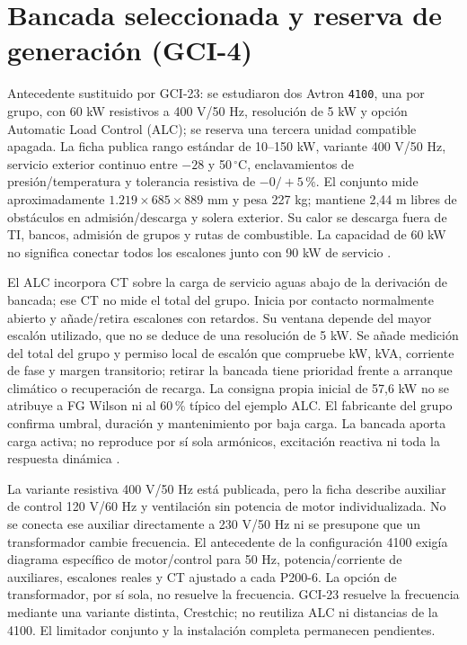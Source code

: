 \section{Bancada seleccionada y reserva de generación (GCI-4)}
\label{sec:sd4-generacion-gci4}

Antecedente sustituido por GCI-23: se estudiaron dos Avtron \texttt{4100}, una por grupo, con 60 kW resistivos a 400 V/50 Hz, resolución de 5 kW y opción Automatic Load Control (ALC); se reserva una tercera unidad compatible apagada. La ficha publica rango estándar de 10--150 kW, variante 400 V/50 Hz, servicio exterior continuo entre $-28$ y 50\,$^{\circ}$C, enclavamientos de presión/temperatura y tolerancia resistiva de $-0/+5\,\%$. El conjunto mide aproximadamente $1.219\times685\times889$ mm y pesa 227 kg; mantiene 2,44 m libres de obstáculos en admisión/descarga y solera exterior. Su calor se descarga fuera de TI, bancos, admisión de grupos y rutas de combustible. La capacidad de 60 kW no significa conectar todos los escalones junto con 90 kW de servicio \parencite[pp.~1--2]{lote17-avtron-4100}.

El ALC incorpora CT sobre la carga de servicio aguas abajo de la derivación de bancada; ese CT no mide el total del grupo. Inicia por contacto normalmente abierto y añade/retira escalones con retardos. Su ventana depende del mayor escalón utilizado, que no se deduce de una resolución de 5 kW. Se añade medición del total del grupo y permiso local de escalón que compruebe kW, kVA, corriente de fase y margen transitorio; retirar la bancada tiene prioridad frente a arranque climático o recuperación de recarga. La consigna propia inicial de 57,6 kW no se atribuye a FG Wilson ni al 60\,\% típico del ejemplo ALC. El fabricante del grupo confirma umbral, duración y mantenimiento por baja carga. La bancada aporta carga activa; no reproduce por sí sola armónicos, excitación reactiva ni toda la respuesta dinámica \parencite[pp.~1--2]{lote17-avtron-alc}.

La variante resistiva 400 V/50 Hz está publicada, pero la ficha describe auxiliar de control 120 V/60 Hz y ventilación sin potencia de motor individualizada. No se conecta ese auxiliar directamente a 230 V/50 Hz ni se presupone que un transformador cambie frecuencia. El antecedente de la configuración 4100 exigía diagrama específico de motor/control para 50 Hz, potencia/corriente de auxiliares, escalones reales y CT ajustado a cada P200-6. La opción de transformador, por sí sola, no resuelve la frecuencia. GCI-23 resuelve la frecuencia mediante una variante distinta, Crestchic; no reutiliza ALC ni distancias de la 4100. El limitador conjunto y la instalación completa permanecen pendientes.

